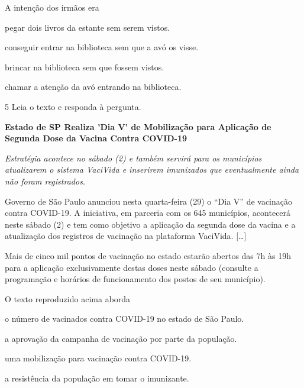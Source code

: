 A intenção dos irmãos era

\begin{escolha}
\item pegar dois livros da estante sem serem vistos.

\item conseguir entrar na biblioteca sem que a avó os visse.

\item brincar na biblioteca sem que fossem vistos.

\item chamar a atenção da avó entrando na biblioteca.
\end{escolha}

\num{5} Leia o texto e responda à pergunta.

\begin{myquote}
\textbf{Estado de SP Realiza 'Dia V' de Mobilização para Aplicação de
Segunda Dose da Vacina Contra COVID-19}

\textit{Estratégia acontece no sábado (2) e também servirá para os
municípios atualizarem o sistema VaciVida e inserirem imunizados que
eventualmente ainda não foram registrados.}

Governo de São Paulo anunciou nesta quarta-feira (29) o ``Dia V'' de
vacinação contra COVID-19. A iniciativa, em parceria com os 645
municípios, acontecerá neste sábado (2) e tem como objetivo a aplicação
da segunda dose da vacina e a atualização dos registros de vacinação na
plataforma VaciVida. {[}\ldots{}{]}

Mais de cinco mil pontos de vacinação no estado estarão abertos das 7h
às 19h para a aplicação exclusivamente destas doses neste sábado
(consulte a programação e horários de funcionamento dos postos de seu
município).

\end{myquote}

O texto reproduzido acima aborda

\begin{escolha}
  \item o número de vacinados contra COVID-19 no estado de São Paulo.

  \item a aprovação da campanha de vacinação por parte da população.

  \item uma mobilização para vacinação contra COVID-19.

  \item a resistência da população em tomar o imunizante.
\end{escolha}

